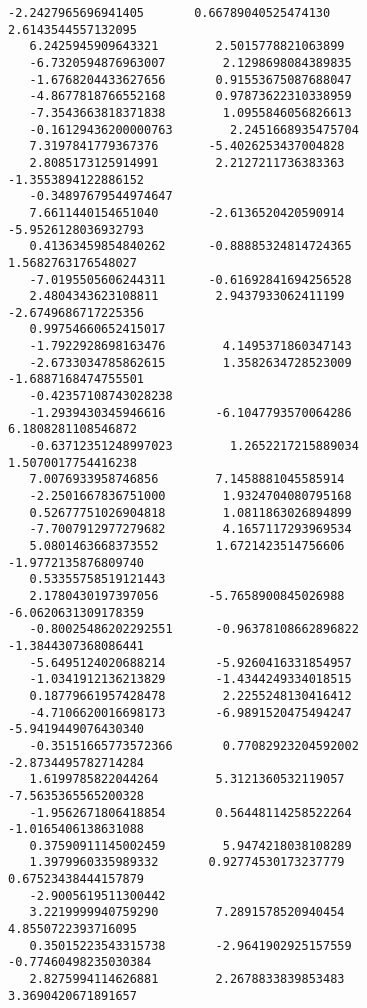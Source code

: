 \begin{lstlisting}[caption=Example of a correct box-file]
   -2.2427965696941405       0.66789040525474130        2.6143544557132095     
   6.2425945909643321        2.5015778821063899       
   -6.7320594876963007        2.1298698084389835       
   -1.6768204433627656       0.91553675087688047     
   -4.8677818766552168       0.97873622310338959       
   -7.3543663818371838        1.0955846056826613      
   -0.16129436200000763        2.2451668935475704     
   7.3197841779367376       -5.4026253437004828        
   2.8085173125914991        2.2127211736383363       -1.3553894122886152      
   -0.34897679544974647     
   7.6611440154651040       -2.6136520420590914       -5.9526128036932793       
   0.41363459854840262      -0.88885324814724365        1.5682763176548027     
   -7.0195505606244311      -0.61692841694256528        
   2.4804343623108811        2.9437933062411199       -2.6749686717225356       
   0.99754660652415017     
   -1.7922928698163476        4.1495371860347143       
   -2.6733034785862615        1.3582634728523009       -1.6887168474755501      
   -0.42357108743028238     
   -1.2939430345946616       -6.1047793570064286        6.1808281108546872      
   -0.63712351248997023        1.2652217215889034        1.5070017754416238     
   7.0076933958746856        7.1458881045585914       
   -2.2501667836751000        1.9324704080795168       
   0.52677751026904818        1.0811863026894899     
   -7.7007912977279682        4.1657117293969534        
   5.0801463668373552        1.6721423514756606       -1.9772135876809740       
   0.53355758519121443     
   2.1780430197397056       -5.7658900845026988       -6.0620631309178359      
   -0.80025486202292551      -0.96378108662896822       -1.3844307368086441     
   -5.6495124020688214       -5.9260416331854957       
   -1.0341912136213829       -1.4344249334018515       
   0.18779661957428478        2.2255248130416412     
   -4.7106620016698173       -6.9891520475494247       -5.9419449076430340      
   -0.35151665773572366       0.77082923204592002       -2.8734495782714284     
   1.6199785822044264        5.3121360532119057       -7.5635365565200328       
   -1.9562671806418854       0.56448114258522264       -1.0165406138631088     
   0.37590911145002459        5.9474218038108289        
   1.3979960335989332       0.92774530173237779       0.67523438444157879       
   -2.9005619511300442     
   3.2219999940759290        7.2891578520940454        4.8550722393716095       
   0.35015223543315738       -2.9641902925157559      -0.77460498235030384     
   2.8275994114626881        2.2678833839853483        3.3690420671891657       

\end{lstlisting}
